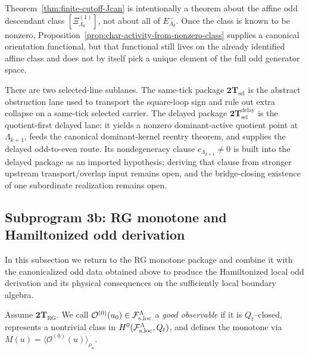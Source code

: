\begin{remark}
\label{rem:class-not-whole-space}
Theorem~\ref{thm:finite-cutoff-Jcan} is intentionally a theorem about the affine
odd descendant class \([\Xi^{(1)}_{\Lambda_k}]\), not about all of
\(E^-_{\Lambda_k}\). Once the class is known to be nonzero,
Proposition~\ref{prop:char-activity-from-nonzero-class} supplies a canonical orientation
functional, but that functional still lives on the already identified affine class and does not by
itself pick a unique element of the full odd generator space.
\end{remark}

\begin{remark}
\label{rem:Main-activity-gap}
There are two selected-line sublanes.
The same-tick package \(\mathbf{2T}_{\mathrm{sel}}\) is the abstract obstruction lane used
to transport the square-loop sign and rule out extra collapse on a same-tick selected carrier.
The delayed package \(\mathbf{2T}_{\mathrm{sel}}^{\mathrm{delay}}\) is the quotient-first
delayed lane: it yields a nonzero dominant-active quotient point at
\(\Lambda_{k+1}\), feeds the canonical dominant-kernel reentry theorem, and
supplies the delayed odd-to-even route.
Its nondegeneracy clause \(c_{\Lambda_{k+1}}\neq 0\) is built into the delayed package as an
imported hypothesis; deriving that clause from stronger upstream transport/overlap input remains
open, and the bridge-closing existence of one subordinate realization remains open.
\end{remark}

\subsection{Subprogram 3b: RG monotone and Hamiltonized odd derivation}
\label{sec:subprogram3b}

In this subsection we return to the RG monotone package and combine it with the
canonicalized odd data obtained above to produce the Hamiltonized local odd
derivation and its physical consequences on the sufficiently local boundary
algebra.

\begin{definition}[RG monotone]
\label{def:RG-monotone}
Assume $\mathbf{2T}_{\mathrm{RG}}$. We call $\mathcal O^{(0)}(u_0)\in\mathcal F_{\mathrm{s.loc}}^\Lambda$ a
\emph{good observable} if it is $Q_t$--closed, represents a nontrivial class in
$H^0(\mathcal F_{\mathrm{s.loc}}^\Lambda,Q_t)$, and defines the monotone via
$M(u)=\langle \mathcal O^{(0)}(u)\rangle_{\rho_u}$.
\par
\end{definition}

